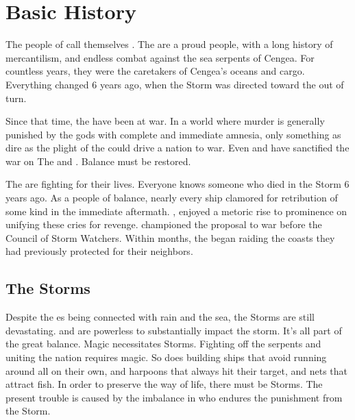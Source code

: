 \documentclass[blue]{GL2020}
\begin{document}
\name{\bVikings{}}



\section*{Basic History}
The people of \pShip{} call themselves \pShippies{}. The \pShippies{} are a proud people, with a long history of mercantilism, and endless combat against the sea serpents of Cengea. For countless years, they were the caretakers of Cengea's oceans and cargo. Everything changed 6 years ago, when the Storm was directed toward the \pShip{} out of turn.

Since that time, the \pShip{} have been at war. In a world where murder is generally punished by the gods with complete and immediate amnesia, only something as dire as the plight of the \pShippies{} could drive a nation to war. Even \cEbbFull{} and \cFlowFull{} have sanctified the war on The \pFarm{} and \pTech{}. Balance must be restored.

The \pShip{} are fighting for their lives. Everyone knows someone who died in the Storm 6 years ago. As a people of balance, nearly every ship clamored for  retribution of some kind in the immediate aftermath. \cLoud{\full}, enjoyed a metoric rise to prominence on unifying these cries for revenge. \cLoud{\They} championed the proposal to war before the Council of Storm Watchers. Within months, the \pShip{} began raiding the coasts they had previously protected for their neighbors.

\subsection*{The Storms}
Despite the \pShip{} \cEbb{\God}es being connected with rain and the sea, the Storms are still devastating. \cEbb{} and \cFlow{} are powerless to substantially impact the storm. It's all part of the great balance. Magic necessitates Storms. Fighting off the serpents and uniting the \pShip{} nation requires magic. So does building ships that avoid running around all on their own, and harpoons that always hit their target, and nets that attract fish. In order to preserve the \pShip{} way of life, there must be Storms. The present trouble is caused by the imbalance in who endures the punishment from the Storm.
\end{document}
